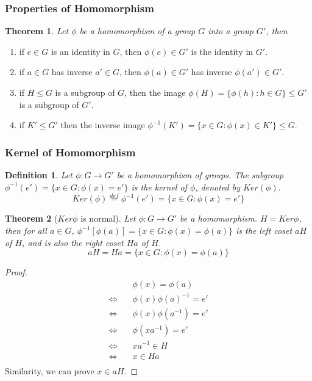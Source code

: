 \documentclass[11pt,a4paper]{article}
\newtheorem{theorem}{Theorem}
\newtheorem{definition}{Definition}
\begin{document}
\subsubsection{Properties of Homomorphism}
\begin{theorem}
    Let $\phi$ be a homomorphism of a group $G$ into a group $G'$, then
\end{theorem}
\begin{enumerate}
    \item if $e\in G$ is an identity in $G$, then $\phi(e)\in G'$ is the identity in $G'$.
    \item if $a\in G$ has inverse $a'\in G$, then $\phi(a)\in G'$ has inverse $\phi(a')\in G'$.
    \item if $H\leq G$ is a subgroup of $G$, then the image $\phi(H)=\{\phi(h):h\in G\}\leq G'$ is a subgroup of $G'$.
    \item if $K'\leq G'$ then the inverse image $\phi^{-1}(K')=\{x\in G:\phi(x)\in K'\}\leq G$.
\end{enumerate}


\subsubsection{Kernel of Homomorphism}
\begin{definition}
    Let $\phi: G \rightarrow G'$ be a homomorphism of groups. The subgroup $\phi^{-1}(e')=\{x\in G:\phi(x)=e'\}$ is the kernel of $\phi$, denoted by $Ker (\phi)$.
    $$Ker (\phi) \stackrel{def}{=} \phi^{-1}(e')=\{x\in G:\phi(x)=e'\}$$
\end{definition}

\begin{theorem}[$Ker\phi$ is normal]
Let $\phi: G \rightarrow G'$ be a homomorphism. $H=Ker\phi$, then for all $a\in G$, $\phi^{-1}[\phi(a)]=\{x\in G:\phi(x)=\phi(a)\}$ is the left coset $aH$ of $H$, and is also the right coset $Ha$ of $H$.
$$aH=Ha=\{x\in G:\phi(x)=\phi(a)\}$$
\end{theorem}
\begin{proof}
\begin{equation}
    \begin{aligned}
        &\phi(x)=\phi(a)\\
        \Leftrightarrow\quad	&\phi(x)\phi(a)^{-1}=e'\\
        \Leftrightarrow\quad	&\phi(x)\phi(a^{-1})=e'\\
        \Leftrightarrow\quad	&\phi(xa^{-1})=e'\\
        \Leftrightarrow\quad	&xa^{-1}\in H\\
        \Leftrightarrow\quad	&x\in Ha\\
    \end{aligned}
    \nonumber
\end{equation}
Similarity, we can prove $x\in aH$.
\end{proof}
\end{document}
